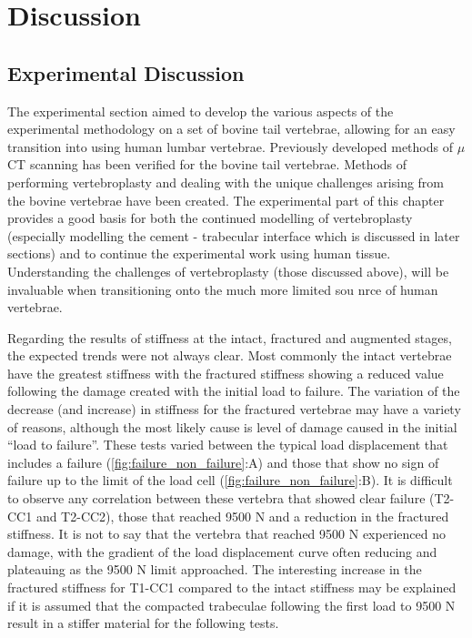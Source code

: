 \section{Discussion}

\subsection{Experimental Discussion}

The experimental section aimed to develop the various aspects of the
experimental methodology on a set of bovine tail vertebrae, allowing for an
easy transition into using human lumbar vertebrae.  Previously developed
methods of $\mu$CT scanning has been verified for the bovine tail vertebrae.
Methods of performing vertebroplasty and dealing with the unique challenges
arising from the bovine vertebrae have been created.  The experimental part of
this chapter provides a good basis for both the continued modelling of
vertebroplasty (especially modelling the cement - trabecular interface which is
discussed in later sections) and to continue the experimental work using human
tissue.  Understanding the challenges of vertebroplasty (those discussed
above), will be invaluable when transitioning onto the much more limited sou
nrce of human vertebrae.


Regarding the results of stiffness at the intact, fractured and augmented
stages, the expected trends were not always clear.  Most commonly the intact
vertebrae have the greatest stiffness with the fractured stiffness showing a
reduced value following the damage created with the initial load to failure.
The variation of the decrease (and increase) in stiffness for the fractured
vertebrae may have a variety of reasons, although the most likely cause is
level of damage caused in the initial ``load to failure''.  These tests varied
between the typical load displacement that includes a failure
(\cref{fig:failure_non_failure}:A) and those that show no sign of failure up to
the limit of the load cell (\cref{fig:failure_non_failure}:B).  It is difficult
to observe any correlation between these vertebra that showed clear failure
(T2-CC1 and T2-CC2), those that reached 9500 N and a reduction in the fractured
stiffness.  It is not to say that the vertebra that reached 9500 N experienced
no damage, with the gradient of the load displacement curve often reducing and
plateauing as the 9500 N limit approached.  The interesting increase in the
fractured stiffness for T1-CC1 compared to the intact stiffness may be
explained if it is assumed that the compacted trabeculae following the first
load to 9500 N result in a stiffer material for the following tests.

